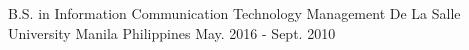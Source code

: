 

\begin{cventries}

  \cventry
    {B.S. in Information Communication Technology Management} %
    {De La Salle University Manila} %
    {Philippines} %
    {May. 2016 - Sept. 2010} %
    {
      \begin{cvitems} %
      \end{cvitems}
    }

\end{cventries}
